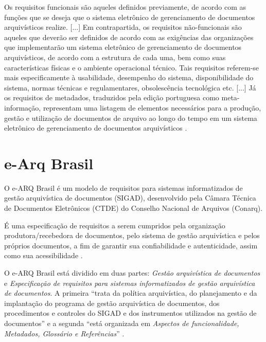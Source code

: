 \documentclass[a4paper,11pt,openright,twoside,brazil]{abntex2}
\begin{document}
\begin{citacao}
Os requisitos funcionais são aqueles definidos previamente, de acordo com as
funções que se deseja que o sistema eletrônico de gerenciamento de documentos
arquivísticos realize. [...] Em contrapartida, os requisitos não-funcionais são
aqueles que deverão ser definidos de acordo com as exigências das organizações
que implementarão um sistema eletrônico de gerenciamento de documentos
arquivísticos, de acordo com a estrutura de cada uma, bem como suas
características físicas e o ambiente operacional técnico. Tais requisitos
referem-se mais especificamente à usabilidade, desempenho do sistema,
disponibilidade do sistema, normas técnicas e regulamentares, obsolescência
tecnológica etc. [...] Já os requisitos de metadados, traduzidos pela edição
portuguesa como meta-informação, representam uma listagem de elementos
necessários para a produção, gestão e utilização de documentos de arquivo ao
longo do tempo em um sistema eletrônico de gerenciamento de documentos
arquivísticos \cite{lima2004}.
\end{citacao}

\section{e-Arq Brasil}
\label{sec-earq-brasil}

O e-ARQ Brasil é um modelo de requisitos para sistemas informatizados de gestão
arquivística de documentos (SIGAD), desenvolvido pela Câmara Técnica de
Documentos Eletrônicos (CTDE) do Conselho Nacional de Arquivos (Conarq).

\begin{citacao}
É uma especificação de requisitos a serem cumpridos pela organização
produtora/recebedora de documentos, pelo sistema de gestão arquivística e pelos
próprios documentos, a fim de garantir sua confiabilidade e autenticidade,
assim como sua acessibilidade \cite[p.~9]{conarq2009}.
\end{citacao}

O e-ARQ Brasil está dividido em duas partes: \emph{Gestão arquivística de
documentos} e \emph{Especificação de requisitos para sistemas informatizados de
gestão arquivística de documentos}. A primeira ``trata da política arquivística,
do planejamento e da implantação do programa de gestão arquivística de
documentos, dos procedimentos e controles do SIGAD e dos instrumentos utilizados
na gestão de documentos'' e a segunda ``está organizada em \emph{Aspectos de
funcionalidade, Metadados, Glossário e Referências}'' \cite[p.~16]{conarq2009}.
\end{document}
